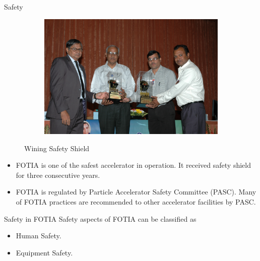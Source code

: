 \documentclass[11pt]{beamer}
\begin{document}
\begin{frame}{Safety}

  \begin{figure}
        \centering
        \begin{subfigure}[b]{0.6\textwidth}
                \includegraphics[width=\textwidth]{DSC_0067.jpg}
        \end{subfigure}%
               
        \caption{Wining Safety Shield}\label{fig:Wining Safety Shield}
\end{figure}
  
   
  
  \begin{itemize}  
    \item FOTIA is one of the safest accelerator in operation. It received safety shield for three consecutive years.
    \item FOTIA is regulated by Particle Accelerator Safety Committee (PASC). Many of FOTIA practices are recommended to other accelerator facilities by PASC.           
   \end{itemize}

\end{frame}

\begin{frame}{Safety in FOTIA}
Safety aspects of FOTIA can be classified as 
 \begin{itemize} 
 \item Human Safety.
 \item Equipment Safety.
\end{itemize} 
\end{frame}
\end{document}
